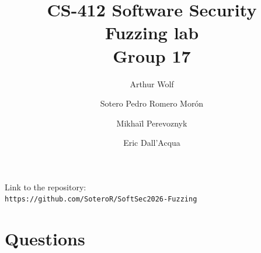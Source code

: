 \documentclass[letterpaper,twocolumn,10pt]{article}
\begin{document}
\date{}

\title{\Large \bf CS-412 Software Security\\
  Fuzzing lab\\
  Group 17
}

\author{
{\rm Arthur Wolf}\\
\and
{\rm Sotero Pedro Romero Morón}\\
\and
{\rm Mikhaïl Perevoznyk}\\
\and
{\rm Eric Dall'Acqua}\\
} %

\maketitle

Link to the repository: \\
\texttt{https://github.com/SoteroR/SoftSec2026-Fuzzing}

\clearpage

\section*{Questions}
\end{document}
